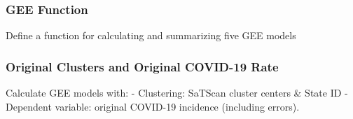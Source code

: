 \documentclass[
]{article}
\begin{document}
\hypertarget{gee-function}{%
\subsubsection{GEE Function}\label{gee-function}}

Define a function for calculating and summarizing five GEE models

\hypertarget{original-clusters-and-original-covid-19-rate}{%
\subsubsection{Original Clusters and Original COVID-19
Rate}\label{original-clusters-and-original-covid-19-rate}}

Calculate GEE models with: - Clustering: SaTScan cluster centers \&
State ID - Dependent variable: original COVID-19 incidence (including
errors).
\end{document}
